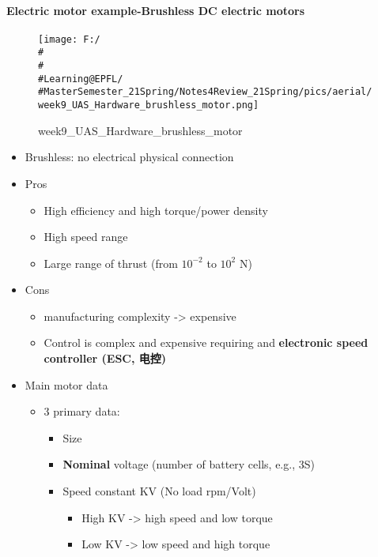 \documentclass[]{article}
\let\oldparagraph\paragraph
\renewcommand{\paragraph}[1]{\oldparagraph{#1}\mbox{}}
\begin{document}
\paragraph{Electric motor example-Brushless DC electric
motors}\label{header-n2040}

\begin{figure}
\centering
\texttt{[image: F:/\\\#\\\#\\\#Learning@EPFL/\\\#MasterSemester\_21Spring/Notes4Review\_21Spring/pics/aerial/week9\_UAS\_Hardware\_brushless\_motor.png]}
\caption{week9\_UAS\_Hardware\_brushless\_motor}
\end{figure}

\begin{itemize}
\item
  Brushless: no electrical physical connection
\item
  Pros

  \begin{itemize}
  \item
    High efficiency and high torque/power density
  \item
    High speed range
  \item
    Large range of thrust (from \(10^{-2}\) to \(10^{2}\) N)
  \end{itemize}
\item
  Cons

  \begin{itemize}
  \item
    manufacturing complexity -\textgreater{} expensive
  \item
    Control is complex and expensive requiring and \textbf{electronic
    speed controller (ESC, 电控)}
  \end{itemize}
\item
  Main motor data

  \begin{itemize}
  \item
    3 primary data:

    \begin{itemize}
    \item
      Size
    \item
      \textbf{Nominal} voltage (number of battery cells, e.g., 3S)
    \item
      Speed constant KV (No load rpm/Volt)

      \begin{itemize}
      \item
        High KV -\textgreater{} high speed and low torque
      \item
        Low KV -\textgreater{} low speed and high torque
      \end{itemize}
    \end{itemize}
  \end{itemize}
\end{itemize}
\end{document}
